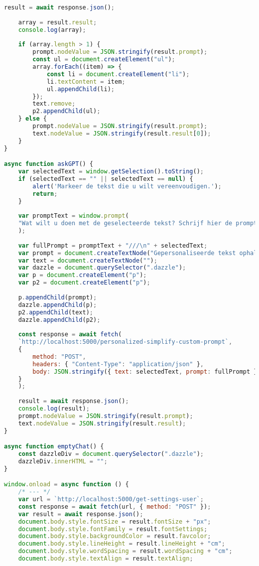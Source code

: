 \begin{lstlisting}[language=JavaScript, caption={De toegepaste scripts voor enkel het scholierencomponent.}, label={code:js-scholars}]
	result = await response.json();
	
	array = result.result;
	console.log(array);
	
	if (array.length > 1) {
		prompt.nodeValue = JSON.stringify(result.prompt);
		const ul = document.createElement("ul");
		array.forEach((item) => {
			const li = document.createElement("li");
			li.textContent = item;
			ul.appendChild(li);
		});
		text.remove;
		p2.appendChild(ul);
	} else {
		prompt.nodeValue = JSON.stringify(result.prompt);
		text.nodeValue = JSON.stringify(result.result[0]);
	}
}

async function askGPT() {
	var selectedText = window.getSelection().toString();
	if (selectedText == "" || selectedText == null) {
		alert('Markeer de tekst die u wilt vereenvoudigen.');
		return;
	}
	
	var promptText = window.prompt(
	"Wat wilt u doen met de geselecteerde tekst? Schrijf hier de prompt...'"
	);
	
	var fullPrompt = promptText + "///\n" + selectedText;
	var prompt = document.createTextNode("Gepersonaliseerde tekst ophalen...");
	var text = document.createTextNode("");
	var dazzle = document.querySelector(".dazzle");
	var p = document.createElement("p");
	var p2 = document.createElement("p");
	
	p.appendChild(prompt);
	dazzle.appendChild(p);
	p2.appendChild(text);
	dazzle.appendChild(p2);
	
	const response = await fetch(
	`http://localhost:5000/personalized-simplify-custom-prompt`,
	{
		method: "POST",
		headers: { "Content-Type": "application/json" },
		body: JSON.stringify({ text: selectedText, prompt: fullPrompt }),
	}
	);
	
	result = await response.json();
	console.log(result);
	prompt.nodeValue = JSON.stringify(result.prompt);
	text.nodeValue = JSON.stringify(result.result);
}

async function emptyChat() {
	const dazzleDiv = document.querySelector(".dazzle");
	dazzleDiv.innerHTML = "";
}

window.onload = async function () {
	/* --- */
	var url = `http://localhost:5000/get-settings-user`;
	const response = await fetch(url, { method: "POST" });
	var result = await response.json();
	document.body.style.fontSize = result.fontSize + "px";
	document.body.style.fontFamily = result.fontSettings;
	document.body.style.backgroundColor = result.favcolor;
	document.body.style.lineHeight = result.lineHeight + "cm";
	document.body.style.wordSpacing = result.wordSpacing + "cm";
	document.body.style.textAlign = result.textAlign;
	

\end{lstlisting}
